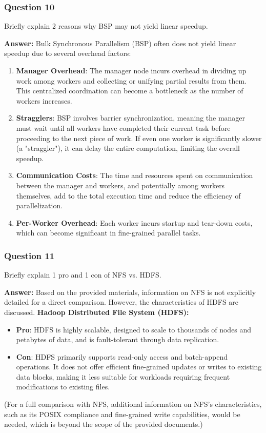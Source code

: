 \documentclass{article}
\begin{document}
\subsubsection*{Question 10}
Briefly explain 2 reasons why BSP may not yield linear speedup. 

\textbf{Answer:}
Bulk Synchronous Parallelism (BSP) often does not yield linear speedup due to several overhead factors:
\begin{enumerate}
    \item \textbf{Manager Overhead}: The manager node incurs overhead in dividing up work among workers and collecting or unifying partial results from them. This centralized coordination can become a bottleneck as the number of workers increases.
    \item \textbf{Stragglers}: BSP involves barrier synchronization, meaning the manager must wait until all workers have completed their current task before proceeding to the next piece of work. If even one worker is significantly slower (a "straggler"), it can delay the entire computation, limiting the overall speedup.
    \item \textbf{Communication Costs}: The time and resources spent on communication between the manager and workers, and potentially among workers themselves, add to the total execution time and reduce the efficiency of parallelization.
    \item \textbf{Per-Worker Overhead}: Each worker incurs startup and tear-down costs, which can become significant in fine-grained parallel tasks.
\end{enumerate}

\subsubsection*{Question 11}
Briefly explain 1 pro and 1 con of NFS vs. HDFS. 

\textbf{Answer:}
Based on the provided materials, information on NFS is not explicitly detailed for a direct comparison. However, the characteristics of HDFS are discussed.
\textbf{Hadoop Distributed File System (HDFS):}
\begin{itemize}
    \item \textbf{Pro}: HDFS is highly scalable, designed to scale to thousands of nodes and petabytes of data, and is fault-tolerant through data replication.
    \item \textbf{Con}: HDFS primarily supports read-only access and batch-append operations. It does not offer efficient fine-grained updates or writes to existing data blocks, making it less suitable for workloads requiring frequent modifications to existing files.
\end{itemize}
(For a full comparison with NFS, additional information on NFS's characteristics, such as its POSIX compliance and fine-grained write capabilities, would be needed, which is beyond the scope of the provided documents.)
\end{document}
